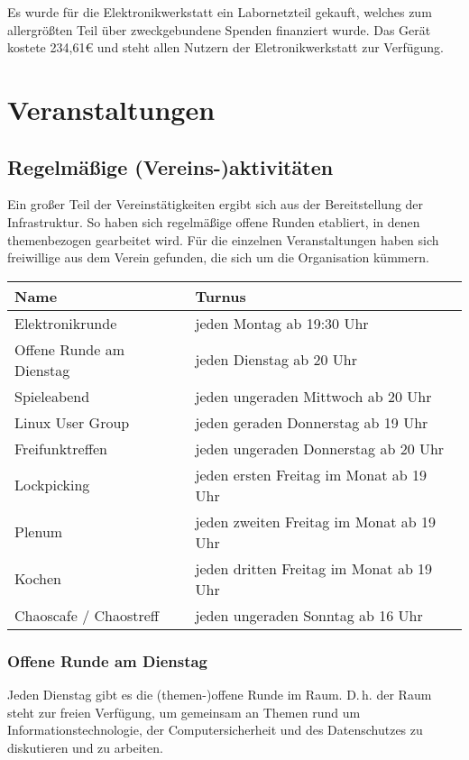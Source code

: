 \documentclass[10pt,DIV16]{scrartcl}
\begin{document}
Es wurde für die Elektronikwerkstatt ein Labornetzteil gekauft, welches 
zum allergrößten Teil über zweckgebundene Spenden finanziert wurde. Das 
Gerät kostete 234,61\euro{} und steht allen Nutzern der 
Eletronikwerkstatt zur Verfügung.

\section{Veranstaltungen}

\subsection{Regelmäßige (Vereins-)aktivitäten}

Ein großer Teil der Vereinstätigkeiten ergibt sich aus der
Bereitstellung der Infrastruktur. So haben sich regelmäßige offene Runden
etabliert, in denen themenbezogen gearbeitet wird. Für die
einzelnen Veranstaltungen haben sich freiwillige aus dem Verein
gefunden, die sich um die Organisation kümmern.

\begin{table}[h]
	\begin{tabular}{l|l}
		Name   &  Turnus \\ \hline
		Elektronikrunde   &  jeden Montag ab 19:30 Uhr\\
		Offene Runde am Dienstag   &  jeden Dienstag ab 20 Uhr\\
		Spieleabend   &  jeden ungeraden Mittwoch ab 20 Uhr\\
		Linux User Group   &  jeden geraden Donnerstag ab 19 Uhr\\
		Freifunktreffen   &  jeden ungeraden Donnerstag ab 20 Uhr\\
		Lockpicking   &  jeden ersten Freitag im Monat ab 19 Uhr\\
		Plenum   &  jeden zweiten Freitag im Monat ab 19 Uhr\\
		Kochen   &  jeden dritten Freitag im Monat ab 19 Uhr\\
		Chaoscafe / Chaostreff   &  jeden ungeraden Sonntag ab 16 Uhr\\
\end{tabular}
\end{table}

\subsubsection{Offene Runde am Dienstag}

Jeden Dienstag gibt es die (themen-)offene Runde im Raum. D.\,h. der Raum
steht zur freien Verfügung, um gemeinsam an Themen rund um
Informationstechnologie, der Computersicherheit und des
Datenschutzes zu diskutieren und zu arbeiten.
\end{document}
